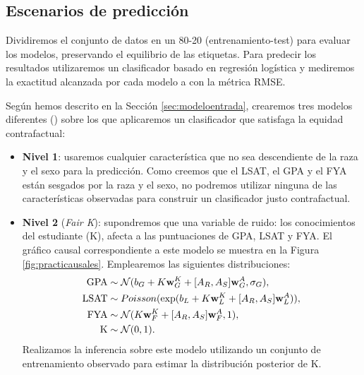\documentclass[oneside,openright,titlepage,numbers=noenddot,openany,headinclude,footinclude=true,
cleardoublepage=empty,abstractoff,BCOR=5mm,paper=a4,fontsize=12pt,main=spanish]{scrreprt}
\begin{document}
\subsection{Escenarios de predicción}

Dividiremos el conjunto de datos en un 80-20 (entrenamiento-test) para evaluar los modelos, preservando el equilibrio de las etiquetas. Para predecir los resultados utilizaremos un clasificador basado en regresión logística y mediremos la exactitud alcanzada por cada modelo a con la métrica RMSE.  

Según hemos descrito en la Sección \ref{sec:modeloentrada}, crearemos tres modelos diferentes (\cite{counterfactual2018}) sobre los que aplicaremos un clasificador que satisfaga la equidad contrafactual: 

\begin{itemize}
    \item \textbf{Nivel 1}: usaremos cualquier característica que no sea descendiente de la raza y el sexo para la predicción. Como creemos que el LSAT, el GPA y el FYA están sesgados por la raza y el sexo, no podremos utilizar ninguna de las características observadas para construir un clasificador justo contrafactual.
    
    \item \textbf{Nivel 2} (\textit{Fair K}): supondremos que una variable de ruido: los conocimientos del estudiante (K), afecta a las puntuaciones de GPA, LSAT y FYA. El gráfico causal correspondiente a este modelo se muestra en la Figura \ref{fig:practicausales}. Emplearemos las siguientes distribuciones:
    \begin{equation*}
    \begin{split}
        \text{GPA} &\sim \mathcal{N}(b_G+K \textbf{w}^K_G+[A_R,A_S] \textbf{w}^A_G, \sigma_G),\\
        \text{LSAT} &\sim Poisson(\text{exp}(b_L+K \textbf{w}^K_L +[A_R,A_S] \textbf{w}^A_L)),\\ 
        \text{FYA}&\sim \mathcal{N}(K \textbf{w}^K_F+[A_R,A_S] \textbf{w}^A_F, 1),\\
        \text{K}&\sim \mathcal{N}(0,1).
    \end{split}
    \end{equation*}
    Realizamos la inferencia sobre este modelo utilizando un conjunto de entrenamiento observado para estimar la distribución posterior de K.
    

\end{itemize}
\end{document}
